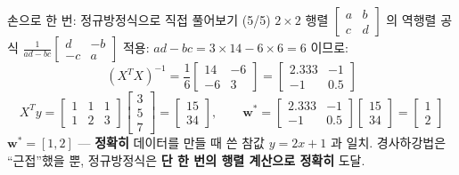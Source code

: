 \begin{frame}{손으로 한 번: 정규방정식으로 직접 풀어보기 (5/5)}
  $2 \times 2$ 행렬 $\begin{bmatrix}a&b\\c&d\end{bmatrix}$ 의
  역행렬 공식 $\frac{1}{ad-bc}\begin{bmatrix}d&-b\\-c&a\end{bmatrix}$
  적용: $ad-bc = 3\times14-6\times6 = 6$ 이므로:
  \[
  (X^TX)^{-1} = \frac{1}{6}\begin{bmatrix}14&-6\\-6&3\end{bmatrix}
  = \begin{bmatrix}2.333&-1\\-1&0.5\end{bmatrix}
  \]
  \[
  X^Ty = \begin{bmatrix}1&1&1\\1&2&3\end{bmatrix}
  \begin{bmatrix}3\\5\\7\end{bmatrix}
  = \begin{bmatrix}15\\34\end{bmatrix}, \hspace{2em}
  \boldsymbol{w}^{*} = \begin{bmatrix}2.333&-1\\-1&0.5\end{bmatrix}
  \begin{bmatrix}15\\34\end{bmatrix}
  = \begin{bmatrix}1\\2\end{bmatrix}
  \]
  $\boldsymbol{w}^{*} = [1, 2]$ --- \textbf{정확히} 데이터를 만들 때 쓴 참값
  $y = 2x+1$ 과 일치. 경사하강법은 ``근접''했을 뿐, 정규방정식은
  \textbf{단 한 번의 행렬 계산으로 정확히} 도달.
\end{frame}

